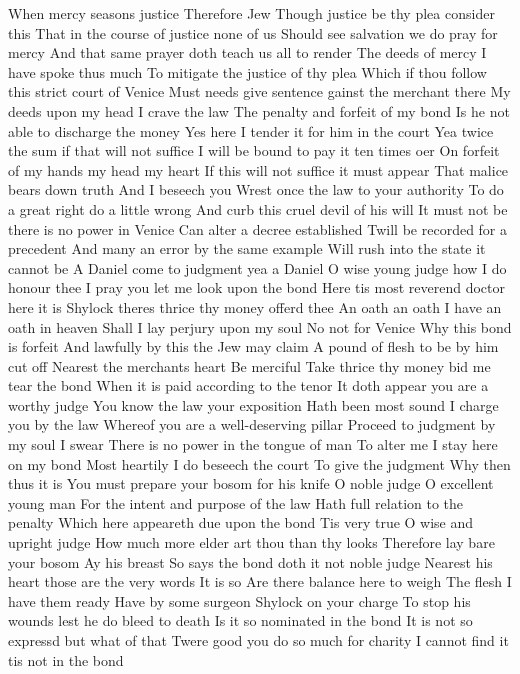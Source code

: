 When mercy seasons justice Therefore Jew
Though justice be thy plea consider this
That in the course of justice none of us
Should see salvation we do pray for mercy
And that same prayer doth teach us all to render
The deeds of mercy I have spoke thus much
To mitigate the justice of thy plea
Which if thou follow this strict court of Venice
Must needs give sentence gainst the merchant there
My deeds upon my head I crave the law
The penalty and forfeit of my bond
Is he not able to discharge the money
Yes here I tender it for him in the court
Yea twice the sum if that will not suffice
I will be bound to pay it ten times oer
On forfeit of my hands my head my heart
If this will not suffice it must appear
That malice bears down truth And I beseech you
Wrest once the law to your authority
To do a great right do a little wrong
And curb this cruel devil of his will
It must not be there is no power in Venice
Can alter a decree established
Twill be recorded for a precedent
And many an error by the same example
Will rush into the state it cannot be
A Daniel come to judgment yea a Daniel
O wise young judge how I do honour thee
I pray you let me look upon the bond
Here tis most reverend doctor here it is
Shylock theres thrice thy money offerd thee
An oath an oath I have an oath in heaven
Shall I lay perjury upon my soul
No not for Venice
Why this bond is forfeit
And lawfully by this the Jew may claim
A pound of flesh to be by him cut off
Nearest the merchants heart Be merciful
Take thrice thy money bid me tear the bond
When it is paid according to the tenor
It doth appear you are a worthy judge
You know the law your exposition
Hath been most sound I charge you by the law
Whereof you are a well-deserving pillar
Proceed to judgment by my soul I swear
There is no power in the tongue of man
To alter me I stay here on my bond
Most heartily I do beseech the court
To give the judgment
Why then thus it is
You must prepare your bosom for his knife
O noble judge O excellent young man
For the intent and purpose of the law
Hath full relation to the penalty
Which here appeareth due upon the bond
Tis very true O wise and upright judge
How much more elder art thou than thy looks
Therefore lay bare your bosom
Ay his breast
So says the bond doth it not noble judge
Nearest his heart those are the very words
It is so Are there balance here to weigh
The flesh
I have them ready
Have by some surgeon Shylock on your charge
To stop his wounds lest he do bleed to death
Is it so nominated in the bond
It is not so expressd but what of that
Twere good you do so much for charity
I cannot find it tis not in the bond
